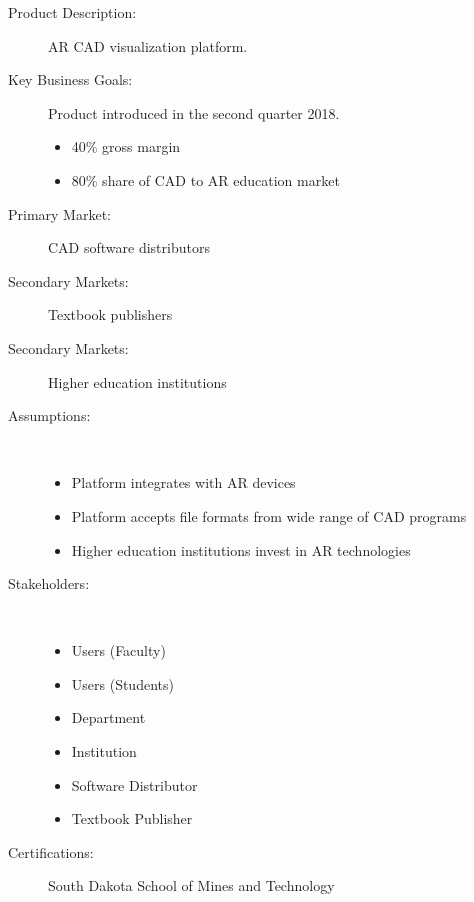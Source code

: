 

\begin{description}
	\item [Product Description:] AR CAD visualization platform.
	
	\item [Key Business Goals:] Product introduced in the second quarter 2018.
	\begin{itemize}
		\item 40\% gross margin
		\item 80\% share of CAD to AR education market
	\end{itemize}
	
	\item [Primary Market:] CAD software distributors
	\item [Secondary Markets:] Textbook publishers
	\item [Secondary Markets:] Higher education institutions
	
	\item [Assumptions:]  ~~ \\
	\begin{itemize}
		\item Platform integrates with AR devices 
		\item Platform accepts file formats from wide range of CAD programs
		\item Higher education institutions invest in AR technologies
	\end{itemize}
	
	\item [Stakeholders:]  ~~ \\
	\begin{itemize}
		\item Users (Faculty)
		\item Users (Students)
		\item Department
		\item Institution
		\item Software Distributor
		\item Textbook Publisher
	\end{itemize}
	
	\item [Certifications:] South Dakota School of Mines and Technology
\end{description}

